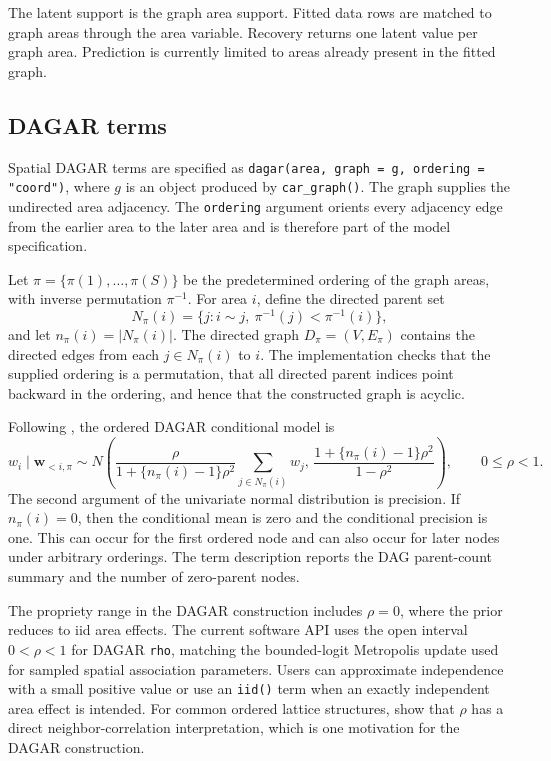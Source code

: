 \documentclass[11pt]{article}
\newcommand{\bw}{\bm{w}}
\begin{document}
The latent support is the graph area support. Fitted data rows are matched to graph areas through the area variable. Recovery returns one latent value per graph area. Prediction is currently limited to areas already present in the fitted graph.

\subsection{DAGAR terms}

Spatial DAGAR terms are specified as \texttt{dagar(area, graph = g, ordering = "coord")}, where $g$ is an object produced by \texttt{car\_graph()}. The graph supplies the undirected area adjacency. The \texttt{ordering} argument orients every adjacency edge from the earlier area to the later area and is therefore part of the model specification.

Let $\pi=\{\pi(1),\ldots,\pi(S)\}$ be the predetermined ordering of the graph areas, with inverse permutation $\pi^{-1}$. For area $i$, define the directed parent set
\begin{equation}
  N_\pi(i)
    =
    \{j: i\sim j,\ \pi^{-1}(j)<\pi^{-1}(i)\},
\end{equation}
and let $n_\pi(i)=|N_\pi(i)|$. The directed graph $D_\pi=(V,E_\pi)$ contains the directed edges from each $j\in N_\pi(i)$ to $i$. The implementation checks that the supplied ordering is a permutation, that all directed parent indices point backward in the ordering, and hence that the constructed graph is acyclic.

Following \cite{DattaDAGAR2019}, the ordered DAGAR conditional model is
\begin{equation}
  w_i \mid \bw_{<i,\pi}
  \sim
  N\left(
    \frac{\rho}{1+\{n_\pi(i)-1\}\rho^2}
    \sum_{j\in N_\pi(i)} w_j,\,
    \frac{1+\{n_\pi(i)-1\}\rho^2}{1-\rho^2}
  \right),
  \qquad 0 \leq \rho < 1.
\end{equation}
The second argument of the univariate normal distribution is precision. If $n_\pi(i)=0$, then the conditional mean is zero and the conditional precision is one. This can occur for the first ordered node and can also occur for later nodes under arbitrary orderings. The term description reports the DAG parent-count summary and the number of zero-parent nodes.

The propriety range in the DAGAR construction includes $\rho=0$, where the prior reduces to iid area effects. The current software API uses the open interval $0<\rho<1$ for DAGAR \texttt{rho}, matching the bounded-logit Metropolis update used for sampled spatial association parameters. Users can approximate independence with a small positive value or use an \texttt{iid()} term when an exactly independent area effect is intended. For common ordered lattice structures, \citet{DattaDAGAR2019} show that $\rho$ has a direct neighbor-correlation interpretation, which is one motivation for the DAGAR construction.
\end{document}

